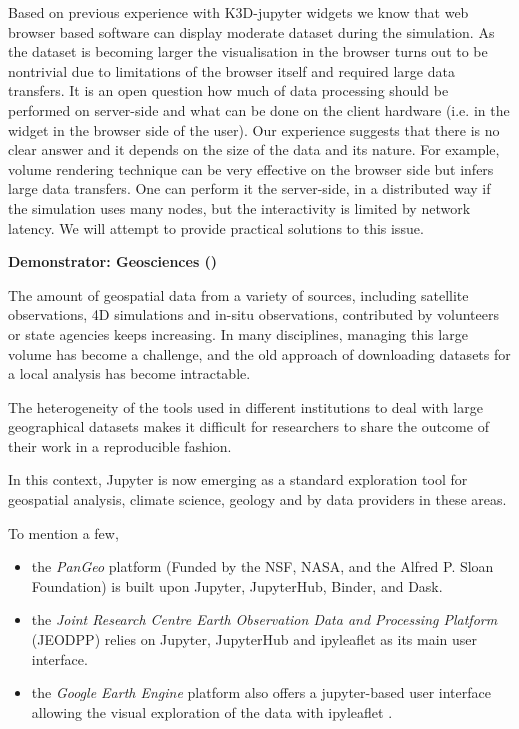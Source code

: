 Based on previous experience with K3D-jupyter\cite{K3D}
widgets we know that web browser based software can display moderate
dataset during the simulation. As the dataset is becoming larger the
visualisation in the browser turns out to be nontrivial due to
limitations of the browser itself and required large data transfers. It is
an open question how much of data processing should be performed on
server-side and what can be done on the client hardware (i.e. in the
widget in the browser side of the user). Our
experience suggests that there is no clear answer and it depends on
the size of the data and its nature. For example, volume rendering
technique can be very effective on the browser side but infers large data
transfers. One can perform it the server-side, in a distributed way if
the simulation uses many nodes, but the interactivity is limited by
network latency. We will attempt to provide practical
solutions to this issue.
%

\medskip
\textbf{Demonstrator: Geosciences ()}\label{sec:concept-demonstrators-geo}

The amount of geospatial data from a variety of sources, including satellite observations, 4D simulations and in-situ observations, contributed by volunteers
or state agencies keeps increasing. In many disciplines, managing this large volume
has become a challenge, and the old approach of downloading datasets for a local
analysis has become intractable.

The heterogeneity of the tools used in different institutions to deal with
large geographical datasets makes it difficult for researchers to share the outcome
of their work in a reproducible fashion.

In this context, Jupyter is now emerging as a standard exploration tool for
geospatial analysis, climate science, geology and by data providers in these areas.

To mention a few,
\begin{itemize}
\item
   the \emph{PanGeo} platform \cite{Pangeo2018} (Funded by the NSF, NASA, and the
   Alfred P. Sloan Foundation) is built upon Jupyter, JupyterHub, Binder, and Dask.
\item
   the \emph{Joint Research Centre Earth Observation Data and Processing Platform}
   (JEODPP) \cite{Soille2018} relies on Jupyter, JupyterHub and ipyleaflet as
   its main user interface.
\item
   the \emph{Google Earth Engine} platform also offers a jupyter-based user
   interface allowing the visual exploration of the data with ipyleaflet
   \cite{GEEJupyterLeaflet2017}.
\end{itemize}

